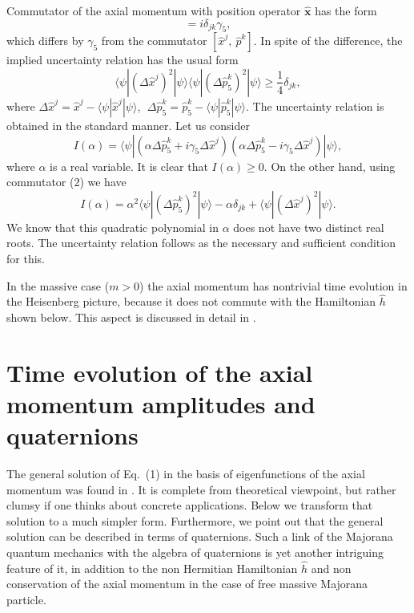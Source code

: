 \documentclass[12pt]{article}
\begin{document}
Commutator of the axial momentum  with position operator $\hat{\mathbf{x}}$  has the form 
\begin{equation}
[ \hat{x}^j, \: \hat{p}_5^k] = i \delta_{jk}  \gamma_5,
\end{equation}
which differs by $\gamma_5$ from the commutator  $[ \hat{x}^j, \: \hat{p}^k]$. In spite of the difference, 
 the implied uncertainty relation has  the usual form 
\[\langle \psi| (\Delta \hat{ x}^j)^2|\psi\rangle \langle \psi |(\Delta \hat{p}_5^k)^2|\psi\rangle \geq  \frac{1}{4} \delta_{jk}, \]  
where  $\Delta \hat{x}^j= \hat{x}^j - \langle\psi| \hat{x}^j|\psi \rangle$, $\;\Delta \hat{p}^k_5 = \hat{p}^k_5 - \langle\psi| \hat{p}^k_5|\psi \rangle$. The uncertainty relation is obtained in the standard manner.  Let us consider  
\[  I(\alpha) =  \langle \psi|  (\alpha \Delta \hat{p}^k_5  + i \gamma_5 \Delta \hat{x}^j)  (\alpha \Delta \hat{p}^k_5  -  i \gamma_5 \Delta \hat{x}^j)|\psi \rangle, \]
where $\alpha$ is a real variable.  It is clear that $I(\alpha) \geq 0$. On the other hand, using  commutator (2)  we have
\[ I(\alpha) = \alpha^2 \langle \psi|  (\Delta \hat{p}_5^k)^2|\psi \rangle - \alpha \delta_{jk} + \langle \psi|  (\Delta \hat{x}^j)^2|\psi \rangle. \] We know that this  quadratic polynomial in $\alpha $ does  not have  two distinct real roots.  The uncertainty relation follows as the necessary and sufficient condition for this. 


In the massive case ($m>0$) the axial momentum has  nontrivial  time evolution in the Heisenberg picture, because it does not commute with the Hamiltonian $\hat{h}$ shown below.  This aspect is discussed in detail  in \cite{10}. 

\section{Time evolution of the axial  momentum amplitudes and quaternions}
The general solution of Eq.\ (1)  in the basis of  eigenfunctions of the axial momentum was found in \cite{10}.  It is  complete from theoretical viewpoint, but rather clumsy 
if one thinks about concrete applications.  Below we transform that solution  to a much simpler form.    Furthermore, we point out that  the general solution  can be described in terms of quaternions. Such a link of the Majorana quantum mechanics with the algebra of quaternions  is yet another intriguing feature of it,  in addition to the  non Hermitian Hamiltonian $\hat{h}$ and non conservation of the axial momentum in the case of free massive Majorana particle.  
\end{document}
